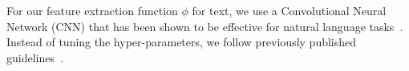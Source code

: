 \documentclass{article}
\begin{document}
For our feature extraction function $\phi$ for text, we use  a Convolutional Neural Network (CNN) that  has been shown to be effective for natural language tasks~\cite{DBLP:journals/corr/KalchbrennerGB14,tagspace}.
Instead of tuning the hyper-parameters, we follow previously published  guidelines~\cite{zhang2015sensitivity}.

\end{document}
